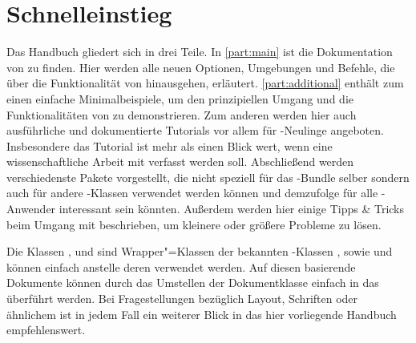 \section{Schnelleinstieg}
Das Handbuch gliedert sich in drei Teile. In \autoref{part:main} ist die 
Dokumentation von \TUDScript zu finden. Hier werden alle neuen Optionen, 
Umgebungen und Befehle, die über die Funktionalität von \KOMAScript{} 
hinausgehen, erläutert. \autoref{part:additional} enthält zum einen einfache 
Minimalbeispiele, um den prinzipiellen Umgang und die Funktionalitäten von 
\TUDScript zu demonstrieren. Zum anderen werden hier auch ausführliche und 
dokumentierte Tutorials vor allem für -Neulinge angeboten. 
Insbesondere das Tutorial  ist mehr als einen Blick wert, 
wenn eine wissenschaftliche Arbeit mit  verfasst werden soll.
Abschließend werden verschiedenste Pakete vorgestellt, die nicht speziell für 
das \TUDScript-Bundle selber sondern auch für andere -Klassen
verwendet werden können und demzufolge für alle -Anwender 
interessant sein könnten. Außerdem werden hier einige Tipps \& Tricks beim 
Umgang mit  beschrieben, um kleinere oder größere Probleme zu 
lösen.

Die Klassen ,  und  
sind Wrapper"=Klassen der bekannten \KOMAScript-Klassen , 
 sowie  und können einfach anstelle deren 
verwendet werden. Auf diesen basierende Dokumente können durch das Umstellen 
der Dokumentklasse einfach in das \TUDCD überführt werden. Bei Fragestellungen 
bezüglich Layout, Schriften oder ähnlichem ist in jedem Fall ein weiterer Blick 
in das hier vorliegende Handbuch empfehlenswert.
